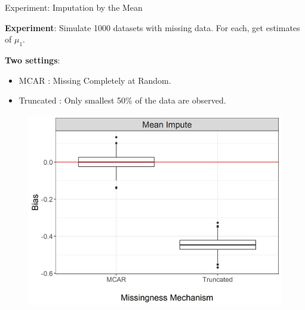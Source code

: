 \documentclass[aspectratio=169,xcolor=dvipsnames]{beamer}
\begin{document}
\begin{frame}{Experiment: Imputation by the Mean}
\noindent\begin{minipage}[t]{0.35\linewidth}
    \vspace{1cm}
    \textbf{Experiment}: Simulate 1000 datasets with missing data. For each, get estimates of $\mu_1$.

    \noindent \textbf{Two settings}:
    \begin{itemize}
        \item {MCAR} : Missing Completely at Random.
        \item {Truncated} : Only smallest 50\% of the data are observed.
    \end{itemize}
\end{minipage}
\noindent\begin{minipage}[t]{0.63\linewidth}
    \begin{figure}
        \centering
        \includegraphics[width=.95\textwidth]{images/plot_bias_1.jpg}
    \end{figure}
\end{minipage}
\end{frame}
\end{document}
